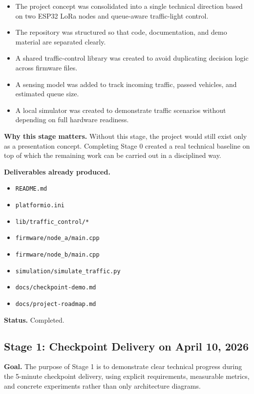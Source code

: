 \documentclass[11pt,a4paper]{article}
\begin{document}
\begin{itemize}
    \item The project concept was consolidated into a single technical direction based on two ESP32 LoRa nodes and queue-aware traffic-light control.
    \item The repository was structured so that code, documentation, and demo material are separated clearly.
    \item A shared traffic-control library was created to avoid duplicating decision logic across firmware files.
    \item A sensing model was added to track incoming traffic, passed vehicles, and estimated queue size.
    \item A local simulator was created to demonstrate traffic scenarios without depending on full hardware readiness.
\end{itemize}

\textbf{Why this stage matters.} Without this stage, the project would still exist only as a presentation concept. Completing Stage 0 created a real technical baseline on top of which the remaining work can be carried out in a disciplined way.

\textbf{Deliverables already produced.}

\begin{itemize}
    \item \texttt{README.md}
    \item \texttt{platformio.ini}
    \item \texttt{lib/traffic\_control/*}
    \item \texttt{firmware/node\_a/main.cpp}
    \item \texttt{firmware/node\_b/main.cpp}
    \item \texttt{simulation/simulate\_traffic.py}
    \item \texttt{docs/checkpoint-demo.md}
    \item \texttt{docs/project-roadmap.md}
\end{itemize}

\textbf{Status.} Completed.

\subsection{Stage 1: Checkpoint Delivery on April 10, 2026}

\textbf{Goal.} The purpose of Stage 1 is to demonstrate clear technical progress during the 5-minute checkpoint delivery, using explicit requirements, measurable metrics, and concrete experiments rather than only architecture diagrams.
\end{document}
